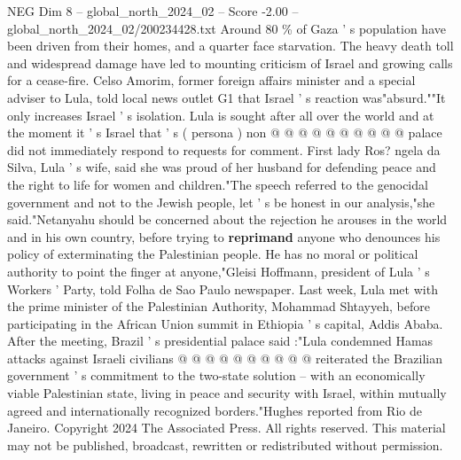\begin{textsample}{NEG Dim 8 – global\_north\_2024\_02 – Score -2.00 – global\_north\_2024\_02/200234428.txt}
Around 80 \% of Gaza ' s population have been driven from their homes, and a quarter face starvation.
The heavy death toll and widespread damage have led to mounting criticism of Israel and growing calls for a cease-fire.
Celso Amorim, former foreign affairs minister and a special adviser to Lula, told local news outlet G1 that Israel ' s reaction was"absurd.""It only increases Israel ' s isolation.
Lula is sought after all over the world and at the moment it ' s Israel that ' s ( persona ) non @ @ @ @ @ @ @ @ @ @ palace did not immediately respond to requests for comment.
First lady Ros? ngela da Silva, Lula ' s wife, said she was proud of her husband for defending peace and the right to life for women and children."The speech referred to the genocidal government and not to the Jewish people, let ' s be honest in our analysis,"she said."Netanyahu should be concerned about the rejection he arouses in the world and in his own country, before trying to \textbf{reprimand} anyone who denounces his policy of exterminating the Palestinian people.
He has no moral or political authority to point the finger at anyone,"Gleisi Hoffmann, president of Lula ' s Workers ' Party, told Folha de Sao Paulo newspaper.
Last week, Lula met with the prime minister of the Palestinian Authority, Mohammad Shtayyeh, before participating in the African Union summit in Ethiopia ' s capital, Addis Ababa.
After the meeting, Brazil ' s presidential palace said :"Lula condemned Hamas attacks against Israeli civilians @ @ @ @ @ @ @ @ @ @ reiterated the Brazilian government ' s commitment to the two-state solution -- with an economically viable Palestinian state, living in peace and security with Israel, within mutually agreed and internationally recognized borders."Hughes reported from Rio de Janeiro.
Copyright 2024 The Associated Press.
All rights reserved.
This material may not be published, broadcast, rewritten or redistributed without permission.

\end{textsample}
